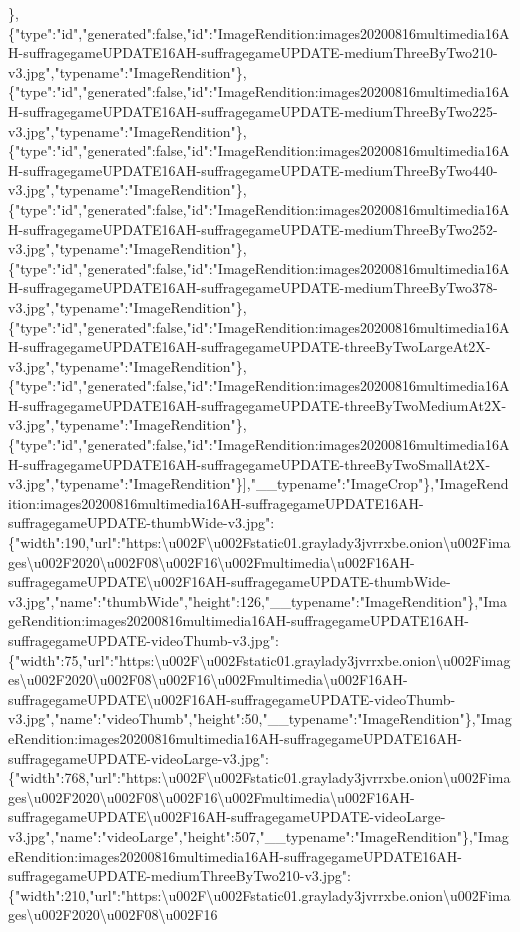 \},\{"type":"id","generated":false,"id":"ImageRendition:images20200816multimedia16AH-suffragegameUPDATE16AH-suffragegameUPDATE-mediumThreeByTwo210-v3.jpg","typename":"ImageRendition"\},\{"type":"id","generated":false,"id":"ImageRendition:images20200816multimedia16AH-suffragegameUPDATE16AH-suffragegameUPDATE-mediumThreeByTwo225-v3.jpg","typename":"ImageRendition"\},\{"type":"id","generated":false,"id":"ImageRendition:images20200816multimedia16AH-suffragegameUPDATE16AH-suffragegameUPDATE-mediumThreeByTwo440-v3.jpg","typename":"ImageRendition"\},\{"type":"id","generated":false,"id":"ImageRendition:images20200816multimedia16AH-suffragegameUPDATE16AH-suffragegameUPDATE-mediumThreeByTwo252-v3.jpg","typename":"ImageRendition"\},\{"type":"id","generated":false,"id":"ImageRendition:images20200816multimedia16AH-suffragegameUPDATE16AH-suffragegameUPDATE-mediumThreeByTwo378-v3.jpg","typename":"ImageRendition"\},\{"type":"id","generated":false,"id":"ImageRendition:images20200816multimedia16AH-suffragegameUPDATE16AH-suffragegameUPDATE-threeByTwoLargeAt2X-v3.jpg","typename":"ImageRendition"\},\{"type":"id","generated":false,"id":"ImageRendition:images20200816multimedia16AH-suffragegameUPDATE16AH-suffragegameUPDATE-threeByTwoMediumAt2X-v3.jpg","typename":"ImageRendition"\},\{"type":"id","generated":false,"id":"ImageRendition:images20200816multimedia16AH-suffragegameUPDATE16AH-suffragegameUPDATE-threeByTwoSmallAt2X-v3.jpg","typename":"ImageRendition"\}{]},"\_\_typename":"ImageCrop"\},"ImageRendition:images20200816multimedia16AH-suffragegameUPDATE16AH-suffragegameUPDATE-thumbWide-v3.jpg":\{"width":190,"url":"https:\textbackslash{}u002F\textbackslash{}u002Fstatic01.graylady3jvrrxbe.onion\textbackslash{}u002Fimages\textbackslash{}u002F2020\textbackslash{}u002F08\textbackslash{}u002F16\textbackslash{}u002Fmultimedia\textbackslash{}u002F16AH-suffragegameUPDATE\textbackslash{}u002F16AH-suffragegameUPDATE-thumbWide-v3.jpg","name":"thumbWide","height":126,"\_\_typename":"ImageRendition"\},"ImageRendition:images20200816multimedia16AH-suffragegameUPDATE16AH-suffragegameUPDATE-videoThumb-v3.jpg":\{"width":75,"url":"https:\textbackslash{}u002F\textbackslash{}u002Fstatic01.graylady3jvrrxbe.onion\textbackslash{}u002Fimages\textbackslash{}u002F2020\textbackslash{}u002F08\textbackslash{}u002F16\textbackslash{}u002Fmultimedia\textbackslash{}u002F16AH-suffragegameUPDATE\textbackslash{}u002F16AH-suffragegameUPDATE-videoThumb-v3.jpg","name":"videoThumb","height":50,"\_\_typename":"ImageRendition"\},"ImageRendition:images20200816multimedia16AH-suffragegameUPDATE16AH-suffragegameUPDATE-videoLarge-v3.jpg":\{"width":768,"url":"https:\textbackslash{}u002F\textbackslash{}u002Fstatic01.graylady3jvrrxbe.onion\textbackslash{}u002Fimages\textbackslash{}u002F2020\textbackslash{}u002F08\textbackslash{}u002F16\textbackslash{}u002Fmultimedia\textbackslash{}u002F16AH-suffragegameUPDATE\textbackslash{}u002F16AH-suffragegameUPDATE-videoLarge-v3.jpg","name":"videoLarge","height":507,"\_\_typename":"ImageRendition"\},"ImageRendition:images20200816multimedia16AH-suffragegameUPDATE16AH-suffragegameUPDATE-mediumThreeByTwo210-v3.jpg":\{"width":210,"url":"https:\textbackslash{}u002F\textbackslash{}u002Fstatic01.graylady3jvrrxbe.onion\textbackslash{}u002Fimages\textbackslash{}u002F2020\textbackslash{}u002F08\textbackslash{}u002F16\textb